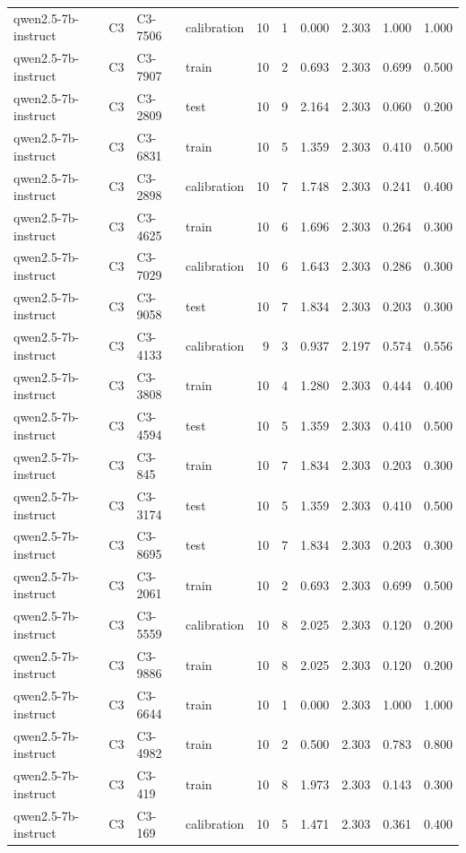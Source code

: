 \begin{table}
\begin{tabular}{llllrrrrrr}
qwen2.5-7b-instruct & C3 & C3-7506 & calibration & 10 & 1 & 0.000 & 2.303 & 1.000 & 1.000 \\
qwen2.5-7b-instruct & C3 & C3-7907 & train & 10 & 2 & 0.693 & 2.303 & 0.699 & 0.500 \\
qwen2.5-7b-instruct & C3 & C3-2809 & test & 10 & 9 & 2.164 & 2.303 & 0.060 & 0.200 \\
qwen2.5-7b-instruct & C3 & C3-6831 & train & 10 & 5 & 1.359 & 2.303 & 0.410 & 0.500 \\
qwen2.5-7b-instruct & C3 & C3-2898 & calibration & 10 & 7 & 1.748 & 2.303 & 0.241 & 0.400 \\
qwen2.5-7b-instruct & C3 & C3-4625 & train & 10 & 6 & 1.696 & 2.303 & 0.264 & 0.300 \\
qwen2.5-7b-instruct & C3 & C3-7029 & calibration & 10 & 6 & 1.643 & 2.303 & 0.286 & 0.300 \\
qwen2.5-7b-instruct & C3 & C3-9058 & test & 10 & 7 & 1.834 & 2.303 & 0.203 & 0.300 \\
qwen2.5-7b-instruct & C3 & C3-4133 & calibration & 9 & 3 & 0.937 & 2.197 & 0.574 & 0.556 \\
qwen2.5-7b-instruct & C3 & C3-3808 & train & 10 & 4 & 1.280 & 2.303 & 0.444 & 0.400 \\
qwen2.5-7b-instruct & C3 & C3-4594 & test & 10 & 5 & 1.359 & 2.303 & 0.410 & 0.500 \\
qwen2.5-7b-instruct & C3 & C3-845 & train & 10 & 7 & 1.834 & 2.303 & 0.203 & 0.300 \\
qwen2.5-7b-instruct & C3 & C3-3174 & test & 10 & 5 & 1.359 & 2.303 & 0.410 & 0.500 \\
qwen2.5-7b-instruct & C3 & C3-8695 & test & 10 & 7 & 1.834 & 2.303 & 0.203 & 0.300 \\
qwen2.5-7b-instruct & C3 & C3-2061 & train & 10 & 2 & 0.693 & 2.303 & 0.699 & 0.500 \\
qwen2.5-7b-instruct & C3 & C3-5559 & calibration & 10 & 8 & 2.025 & 2.303 & 0.120 & 0.200 \\
qwen2.5-7b-instruct & C3 & C3-9886 & train & 10 & 8 & 2.025 & 2.303 & 0.120 & 0.200 \\
qwen2.5-7b-instruct & C3 & C3-6644 & train & 10 & 1 & 0.000 & 2.303 & 1.000 & 1.000 \\
qwen2.5-7b-instruct & C3 & C3-4982 & train & 10 & 2 & 0.500 & 2.303 & 0.783 & 0.800 \\
qwen2.5-7b-instruct & C3 & C3-419 & train & 10 & 8 & 1.973 & 2.303 & 0.143 & 0.300 \\
qwen2.5-7b-instruct & C3 & C3-169 & calibration & 10 & 5 & 1.471 & 2.303 & 0.361 & 0.400 \\

\end{tabular}
\end{table}
